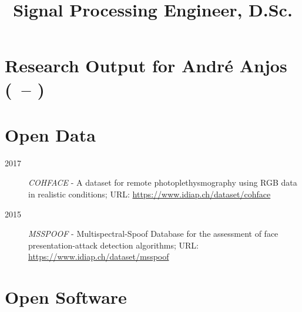 \documentclass[11pt,a4paper,sans]{moderncv}
\title{Signal Processing Engineer, D.Sc.}
\newcounter{startyear}
\begin{document}
\setcounter{startyear}{\year-5}
\section{Research Output for André Anjos (\thestartyear\ -- \the\year)}


\renewcommand{\refname}{Research Output List (reverse chronological order)}
\nocite{*}

\printbibliography[title={Peer Reviewed Journal Articles}, type=article]

\printbibliography[title={Peer Reviewed Books}, type=incollection]

\printbibliography[title={Peer Reviewed Conference Proceedings}, type=inproceedings]

\printbibliography[title={Patents}, type=patent]

\printbibliography[title={Open Access Archive}, type=misc]

\section{Open Data}

\begin{description}
  \item[2017] \textit{COHFACE} - A dataset for remote photoplethysmography
    using RGB data in realistic conditions;
    URL: \url{https://www.idiap.ch/dataset/cohface}

  \item[2015] \textit{MSSPOOF} - Multispectral-Spoof Database for the
    assessment of face presentation-attack detection algorithms;
    URL: \url{https://www.idiap.ch/dataset/msspoof}
\end{description}

\section{Open Software}
\end{document}
